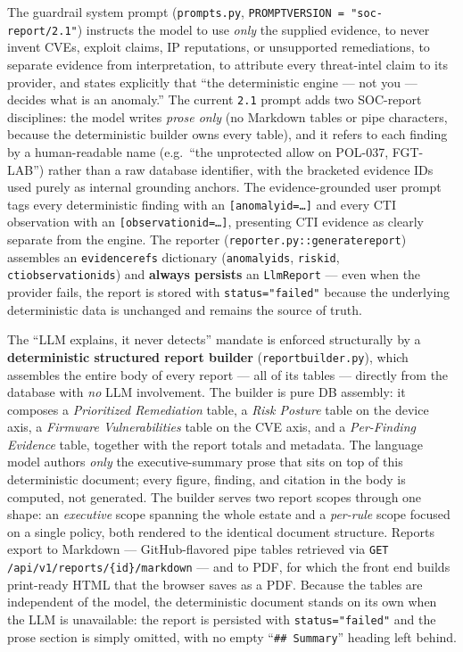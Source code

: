 \documentclass[12pt,a4paper]{report}
\renewcommand{\_}{\textunderscore\allowbreak}
\begin{document}
The guardrail system prompt (\texttt{prompts.py}, \texttt{PROMPT\_VERSION = "soc-report/2.1"}) instructs the model to use \emph{only} the supplied evidence, to never invent CVEs, exploit claims, IP reputations, or unsupported remediations, to separate evidence from interpretation, to attribute every threat-intel claim to its provider, and states explicitly that ``the deterministic engine --- not you --- decides what is an anomaly.'' The current \texttt{2.1} prompt adds two SOC-report disciplines: the model writes \emph{prose only} (no Markdown tables or pipe characters, because the deterministic builder owns every table), and it refers to each finding by a human-readable name (e.g.\ ``the unprotected allow on POL-037, FGT-LAB'') rather than a raw database identifier, with the bracketed evidence IDs used purely as internal grounding anchors. The evidence-grounded user prompt tags every deterministic finding with an \texttt{[anomaly\_id=\dots]} and every CTI observation with an \texttt{[observation\_id=\dots]}, presenting CTI evidence as clearly separate from the engine. The reporter (\texttt{reporter.py::generate\_report}) assembles an \texttt{evidence\_refs} dictionary (\texttt{anomaly\_ids}, \texttt{risk\_id}, \texttt{cti\_observation\_ids}) and \textbf{always persists} an \texttt{LlmReport} --- even when the provider fails, the report is stored with \texttt{status="failed"} because the underlying deterministic data is unchanged and remains the source of truth.

The ``LLM explains, it never detects'' mandate is enforced structurally by a \textbf{deterministic structured report builder} (\texttt{report\_builder.py}), which assembles the entire body of every report --- all of its tables --- directly from the database with \emph{no} LLM involvement. The builder is pure DB assembly: it composes a \emph{Prioritized Remediation} table, a \emph{Risk Posture} table on the device axis, a \emph{Firmware Vulnerabilities} table on the CVE axis, and a \emph{Per-Finding Evidence} table, together with the report totals and metadata. The language model authors \emph{only} the executive-summary prose that sits on top of this deterministic document; every figure, finding, and citation in the body is computed, not generated. The builder serves two report scopes through one shape: an \emph{executive} scope spanning the whole estate and a \emph{per-rule} scope focused on a single policy, both rendered to the identical document structure. Reports export to Markdown --- GitHub-flavored pipe tables retrieved via \texttt{GET /api/v1/reports/\{id\}/markdown} --- and to PDF, for which the front end builds print-ready HTML that the browser saves as a PDF. Because the tables are independent of the model, the deterministic document stands on its own when the LLM is unavailable: the report is persisted with \texttt{status="failed"} and the prose section is simply omitted, with no empty ``\texttt{\#\# Summary}'' heading left behind.
\end{document}
